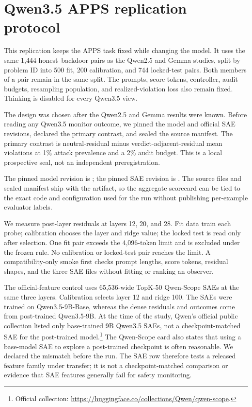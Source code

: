 \section{Qwen3.5 APPS replication protocol}
\label{app:qwen35-apps}

This replication keeps the APPS task fixed while changing the model. It uses
the same 1,444 honest--backdoor pairs as the Qwen2.5 and Gemma studies, split by
problem ID into 500 fit, 200 calibration, and 744 locked-test pairs. Both
members of a pair remain in the same split. The prompts, score tokens,
controller, audit budgets, resampling population, and realized-violation loss
also remain fixed. Thinking is disabled for every Qwen3.5 view.

The design was chosen after the Qwen2.5 and Gemma results were known. Before
reading any Qwen3.5 monitor outcome, we pinned the model and official SAE
revisions, declared the primary contrast, and sealed the source manifest. The
primary contrast is neutral-residual minus verdict-adjacent-residual mean
violations at 1\% attack prevalence and a 2\% audit budget. This is a local
prospective seal, not an independent preregistration.

The pinned model revision is
; the pinned SAE revision is
. The source files and sealed
manifest ship with the artifact, so the aggregate scorecard can be tied to the
exact code and configuration used for the run without publishing per-example
evaluator labels.

We measure post-layer residuals at layers 12, 20, and 28. Fit data train each
probe; calibration chooses the layer and ridge value; the locked test is read
only after selection. One fit pair exceeds the 4,096-token limit and is
excluded under the frozen rule. No calibration or locked-test pair reaches the
limit. A compatibility-only smoke first checks prompt lengths, score tokens,
residual shapes, and the three SAE files without fitting or ranking an
observer.

The official-feature control uses 65,536-wide TopK-50 Qwen-Scope SAEs at the
same three layers. Calibration selects layer 12 and ridge 100. The SAEs were
trained on Qwen3.5-9B-Base, whereas the dense residuals and outcomes come from
post-trained Qwen3.5-9B. At the time of the study, Qwen's official public
collection listed only base-trained 9B Qwen3.5 SAEs, not a checkpoint-matched
SAE for the post-trained model.\footnote{Official collection:
\url{https://huggingface.co/collections/Qwen/qwen-scope}.} The
Qwen-Scope card also states that using a base-model SAE to explore a
post-trained checkpoint is often reasonable. We declared the mismatch before
the run. The SAE row therefore tests a
released feature family under transfer; it is not a checkpoint-matched
comparison or evidence that SAE features generally fail for safety monitoring.

